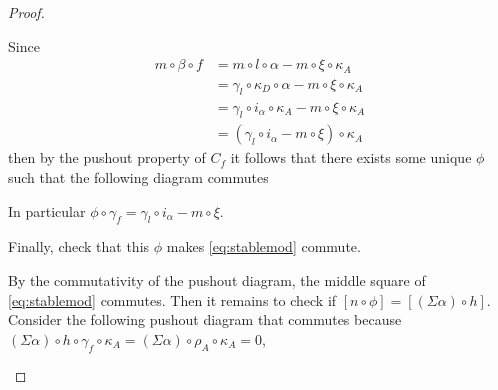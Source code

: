 \begin{proof}
\begin{enumerate}[label={(\bfseries TR\arabic*)}]
{            Since
            \begin{align*}
                m \circ \beta \circ f &= m \circ l \circ \alpha - m \circ \xi \circ \kappa_A \\
                &= \gamma_{l} \circ \kappa_{D} \circ \alpha - m \circ \xi \circ \kappa_A \\
                &= \gamma_{l} \circ i_{\alpha} \circ \kappa_A - m \circ \xi \circ \kappa_A \\
                &= (\gamma_{l} \circ i_{\alpha} - m \circ \xi) \circ \kappa_A
            \end{align*}
            then by the pushout property of \( C_f \) it follows that there exists some unique \( \phi \) such that the following diagram commutes
            \begin{center}
            \end{center}
            In particular \( \phi \circ \gamma_f = \gamma_{l} \circ i_{\alpha} - m \circ \xi \).

            Finally, check that this \( \phi \) makes \autoref{eq:stablemod} commute.

            By the commutativity of the pushout diagram, the middle square of \autoref{eq:stablemod} commutes. Then it remains to check if \( [n \circ \phi] = [(\Sigma \alpha) \circ h] \). Consider the following pushout diagram that commutes because \( (\Sigma \alpha) \circ h \circ \gamma_f \circ \kappa_A = (\Sigma \alpha) \circ \rho_A \circ \kappa_A = 0 \),
            \begin{center}
\end{center}}
\end{enumerate}
\end{proof}
